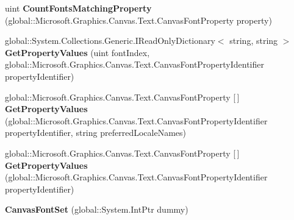 \begin{DoxyCompactItemize}
\item 
\mbox{\label{class_microsoft_1_1_graphics_1_1_canvas_1_1_text_1_1_canvas_font_set_a1b220e58fc624526327b3d8faccceecf}} 
uint {\bfseries Count\+Fonts\+Matching\+Property} (global\+::\+Microsoft.\+Graphics.\+Canvas.\+Text.\+Canvas\+Font\+Property property)
\item 
\mbox{\label{class_microsoft_1_1_graphics_1_1_canvas_1_1_text_1_1_canvas_font_set_a814e7ae485933c4e7fbf68602ad588b9}} 
global\+::\+System.\+Collections.\+Generic.\+I\+Read\+Only\+Dictionary$<$ string, string $>$ {\bfseries Get\+Property\+Values} (uint font\+Index, global\+::\+Microsoft.\+Graphics.\+Canvas.\+Text.\+Canvas\+Font\+Property\+Identifier property\+Identifier)
\item 
\mbox{\label{class_microsoft_1_1_graphics_1_1_canvas_1_1_text_1_1_canvas_font_set_aa821ceb086ad0eb5aed484241b6bea7a}} 
global\+::\+Microsoft.\+Graphics.\+Canvas.\+Text.\+Canvas\+Font\+Property \mbox{[}$\,$\mbox{]} {\bfseries Get\+Property\+Values} (global\+::\+Microsoft.\+Graphics.\+Canvas.\+Text.\+Canvas\+Font\+Property\+Identifier property\+Identifier, string preferred\+Locale\+Names)
\item 
\mbox{\label{class_microsoft_1_1_graphics_1_1_canvas_1_1_text_1_1_canvas_font_set_ad5ad519ae1f152fedadf48d0d911f919}} 
global\+::\+Microsoft.\+Graphics.\+Canvas.\+Text.\+Canvas\+Font\+Property \mbox{[}$\,$\mbox{]} {\bfseries Get\+Property\+Values} (global\+::\+Microsoft.\+Graphics.\+Canvas.\+Text.\+Canvas\+Font\+Property\+Identifier property\+Identifier)
\item 
\mbox{\label{class_microsoft_1_1_graphics_1_1_canvas_1_1_text_1_1_canvas_font_set_aed5c881dc2a997f7281bf32d019b0d26}} 
{\bfseries Canvas\+Font\+Set} (global\+::\+System.\+Int\+Ptr dummy)
\item 
\mbox{\label{class_microsoft_1_1_graphics_1_1_canvas_1_1_text_1_1_canvas_font_set_a8f2287005fb2f87cc3459710f9266acc}} 

\end{DoxyCompactItemize}
